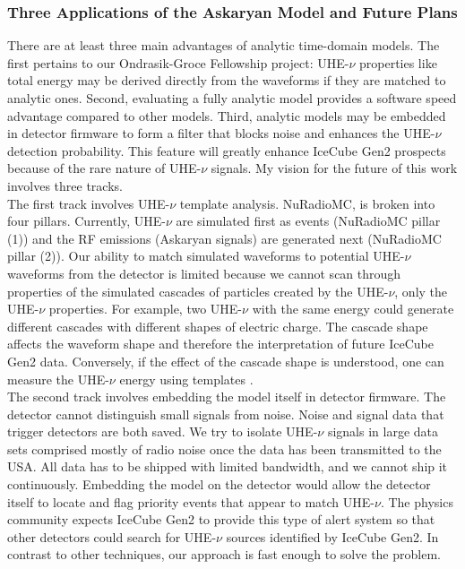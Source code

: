 \documentclass[../../../main.tex]{subfiles}
\begin{document}
\subsubsection{Three Applications of the Askaryan Model and Future Plans}
\label{sec:ask_app}

There are at least three main advantages of analytic time-domain models.  The first pertains to our Ondrasik-Groce Fellowship project: UHE-$\nu$ properties like total energy may be derived directly from the waveforms if they are matched to analytic ones.  Second, evaluating a fully analytic model provides a software speed advantage compared to other models. Third, analytic
models may be embedded in detector firmware to form a filter that blocks noise and enhances the UHE-$\nu$ detection probability. This feature will greatly enhance IceCube Gen2 prospects because of the rare nature of UHE-$\nu$ signals.  My vision for the future of this work involves three tracks.
\\
\vspace{0.15cm}
The first track involves UHE-$\nu$ template analysis. NuRadioMC, is broken into four pillars. Currently, UHE-$\nu$ are simulated first as events (NuRadioMC pillar (1)) and the RF emissions (Askaryan signals) are generated next (NuRadioMC pillar (2)).  Our ability to match simulated waveforms to potential UHE-$\nu$ waveforms from the detector is limited because we cannot scan through properties of the simulated cascades of particles created by the UHE-$\nu$, only the UHE-$\nu$ properties. For example, two UHE-$\nu$ with the same energy could generate different cascades with different shapes of electric charge. The cascade shape affects the waveform shape and therefore the interpretation of future IceCube Gen2 data. Conversely, if the effect of the cascade shape is understood, one can measure the UHE-$\nu$ energy using templates \cite{PhysRevD.105.123019}.
\\
\vspace{0.15cm}
The second track involves embedding the model itself in detector firmware. The detector cannot distinguish small signals from noise. Noise and signal data that trigger detectors are both saved. We try to isolate UHE-$\nu$ signals in large data sets comprised mostly of radio noise once the data has been transmitted to the USA. All data has to be shipped with limited bandwidth, and we cannot ship it continuously. Embedding the model on the detector would allow the detector itself to locate and flag priority events that appear to match UHE-$\nu$. The physics community expects IceCube Gen2 to provide this type of alert system so that other detectors could search for UHE-$\nu$ sources identified by IceCube Gen2.  In contrast to other techniques, our approach is fast enough to solve the problem.
\end{document}
